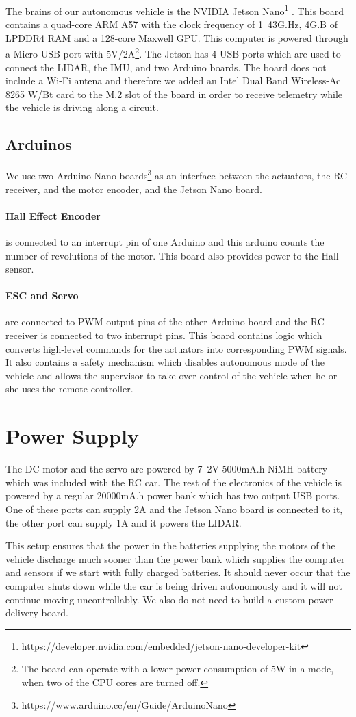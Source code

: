 The brains of our autonomous vehicle is the NVIDIA Jetson Nano\footnote{https://developer.nvidia.com/embedded/jetson-nano-developer-kit} . This board contains a quad-core ARM A57 with the clock frequency of \si{1.43}{G.Hz}, \si{4}{G.B} of LPDDR4 RAM and a 128-core Maxwell GPU. This computer is powered through a Micro-USB port with \si{5}{V}/\si{2}{A}\footnote{The board can operate with a lower power consumption of \si{5}{W} in a mode, when two of the CPU cores are turned off.}. The Jetson has 4 USB ports which are used to connect the LIDAR, the IMU, and two Arduino boards. The board does not include a Wi-Fi antena and therefore we added an Intel Dual Band Wireless-Ac 8265 W/Bt card to the M.2 slot of the board in order to receive telemetry while the vehicle is driving along a circuit.

\subsection{Arduinos}

We use two Arduino Nano boards\footnote{https://www.arduino.cc/en/Guide/ArduinoNano} as an interface between the actuators, the RC receiver, and the motor encoder, and the Jetson Nano board.

\paragraph{Hall Effect Encoder} is connected to an interrupt pin of one Arduino and this arduino counts the number of revolutions of the motor. This board also provides power to the Hall sensor.

\paragraph{ESC and Servo} are connected to PWM output pins of the other Arduino board and the RC receiver is connected to two interrupt pins. This board contains logic which converts high-level commands for the actuators into corresponding PWM signals. It also contains a safety mechanism which disables autonomous mode of the vehicle and allows the supervisor to take over control of the vehicle when he or she uses the remote controller.

\section{Power Supply}

The DC motor and the servo are powered by \si{7.2}{V} \si{5000}{mA.h} NiMH battery which was included with the RC car. The rest of the electronics of the vehicle is powered by a regular \si{20000}{mA.h} power bank which has two output USB ports. One of these ports can supply \si{2}{A} and the Jetson Nano board is connected to it, the other port can supply \si{1}{A} and it powers the LIDAR.

This setup ensures that the power in the batteries supplying the motors of the vehicle discharge much sooner than the power bank which supplies the computer and sensors if we start with fully charged batteries. It should never occur that the computer shuts down while the car is being driven autonomously and it will not continue moving uncontrollably. We also do not need to build a custom power delivery board.